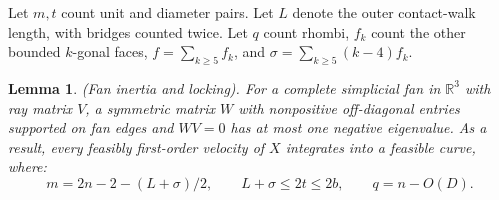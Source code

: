 \documentclass[10pt,reqno]{amsart}
\newtheorem{lemma}{Lemma}[section]
\begin{document}
Let $m, t$ count unit and diameter pairs. Let $L$ denote the outer contact-walk length, with bridges counted twice. Let $q$ count rhombi, $f_k$ count the other bounded $k$-gonal faces, $f = \sum_{k\ge5}f_k$, and $\sigma = \sum_{k \ge 5} (k - 4) f_k$.

\begin{lemma}
    (Fan inertia and locking). For a complete simplicial fan in $\mathbb{R}^3$ with ray matrix $V$, a symmetric matrix $W$ with nonpositive off-diagonal entries supported on fan edges and $WV = 0$ has at most one negative eigenvalue. As a result, every feasibly first-order velocity of $X$ integrates into a feasible curve, where:
    \begin{equation}
        m = 2n - 2 - (L + \sigma) / 2, \qquad L + \sigma \le 2t \le 2b, \qquad q = n - O(D).
    \end{equation}
\end{lemma}
\end{document}
